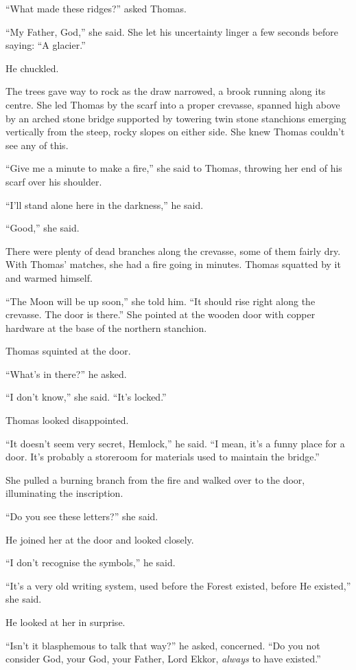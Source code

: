 \documentclass[11pt,a5paper]{article}
\begin{document}
``What made these ridges?'' asked Thomas.

``My Father, God,'' she said. She let his uncertainty linger a few seconds before saying: ``A glacier.''

He chuckled.

The trees gave way to rock as the draw narrowed, a brook running along its centre. She led Thomas by the scarf into a proper crevasse, spanned high above by an arched stone bridge supported by towering twin stone stanchions emerging vertically from the steep, rocky slopes on either side. She knew Thomas couldn't see any of this.

``Give me a minute to make a fire,'' she said to Thomas, throwing her end of his scarf over his shoulder.

``I'll stand alone here in the darkness,'' he said.

``Good,'' she said.

There were plenty of dead branches along the crevasse, some of them fairly dry. With Thomas' matches, she had a fire going in minutes. Thomas squatted by it and warmed himself.

``The Moon will be up soon,'' she told him. ``It should rise right along the crevasse. The door is there.'' She pointed at the wooden door with copper hardware at the base of the northern stanchion.

Thomas squinted at the door.

``What's in there?'' he asked.

``I don't know,'' she said. ``It's locked.''

Thomas looked disappointed.

``It doesn't seem very secret, Hemlock,'' he said. ``I mean, it's a funny place for a door. It's probably a storeroom for materials used to maintain the bridge.''

She pulled a burning branch from the fire and walked over to the door, illuminating the inscription.

``Do you see these letters?'' she said.

He joined her at the door and looked closely.

``I don't recognise the symbols,'' he said.

``It's a very old writing system, used before the Forest existed, before He existed,'' she said.

He looked at her in surprise.

``Isn't it blasphemous to talk that way?'' he asked, concerned. ``Do you not consider God, your God, your Father, Lord Ekkor, \emph{always} to have existed.''
\end{document}
